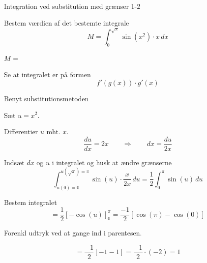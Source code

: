 \documentclass{article}
\begin{document}
\begin{exercise}{Integration ved substitution med grænser 1-2}
	
	
	Bestem værdien af det bestemte integrale
	\[
	M =	\int_{0}^{\sqrt{\pi}} \sin(x^2) \cdot x \, dx
	\]
	
	$M$ = \\
	
	
	
	\hint
	
	Se at integralet er på formen
	\[
	f'(g(x)) \cdot g'(x)
	\]
	
	\hint
	
	Benyt substitutionsmetoden
	
	\hint
	
	Sæt $u=x^2$.
	
	
	\hint
	
	Differentier $u$ mht. $x$.
	\[
	\frac{du}{dx} = 2x \qquad	\Rightarrow \qquad dx = \frac{du}{2x}
	\]
	
	\hint
	
	Indsæt $dx$ og $u$ i integralet og husk at ændre grænserne
	\[
	\int_{u(0)=0}^{u(\sqrt{\pi})=\pi} \sin(u) \cdot \frac{x}{2x} \, du = \frac{1}{2} \int_0^\pi \sin(u) \, du
	\]
	
	\hint
	
	Bestem integralet
	\[
	= \frac{1}{2} \left[-\cos(u) \right]_0^\pi = \frac{-1}{2} \left[\cos(\pi) -\cos(0) \right]
	\]
	
	\hint
	Forenkl udtryk ved at gange ind i parentesen.
	
	\hint
	
	\[
	= \frac{-1}{2} \left[-1 - 1 \right] = \frac{-1}{2} \cdot (-2) = 1
	\]
	
	
\end{exercise}

\newpage
\end{document}
